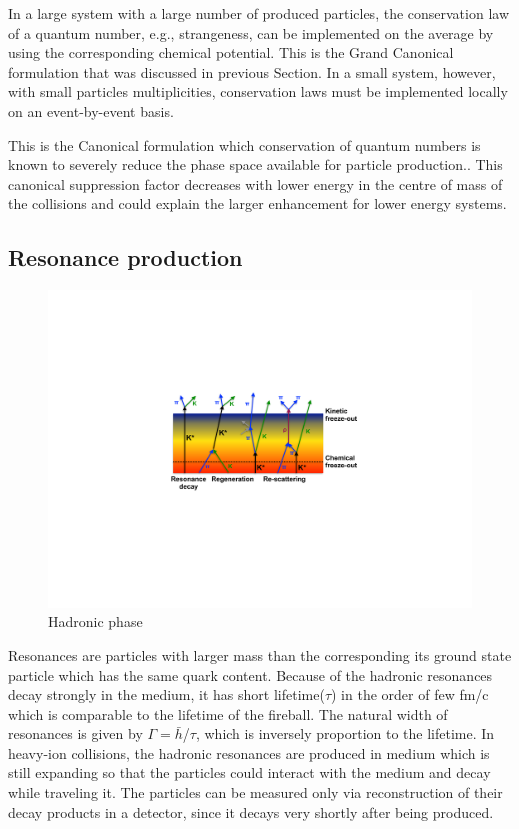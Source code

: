 In a large system with a large number of produced particles, the conservation law of a quantum number, e.g., strangeness, can be implemented on the average by using the corresponding chemical potential. This is the Grand Canonical formulation that was discussed in previous Section. In a small system, however, with small particles multiplicities, conservation laws must be implemented locally on an event-by-event basis. 

This is the Canonical formulation which conservation of quantum numbers is known to severely reduce the phase space available for particle production.\cite{cite:suppression}. This canonical suppression factor decreases with lower energy in the centre of mass of the collisions and could explain the larger enhancement for lower energy systems.



\subsection{Resonance production}

\begin{figure}[htbp]
\begin{center}
\includegraphics[width=12.cm]{./Version1/FigChapter3/Hadronic}
\caption{Hadronic phase }
\label{fig:hadronic}
\end{center}
\end{figure}



Resonances are particles with larger mass than the corresponding its ground state particle which has the same quark content. Because of the hadronic resonances decay strongly in the medium, it has short lifetime($\tau$) in the order of few fm/c which is comparable to the lifetime of the fireball. The natural width of resonances is given by $\Gamma = \bar{h}$/$\tau$, which is inversely proportion to the lifetime. 
In heavy-ion collisions, the hadronic resonances are produced in medium which is still expanding so that the particles could interact with the medium and decay while traveling it. The particles can be measured only via reconstruction of their decay products in a detector, since it decays very shortly after being produced.

